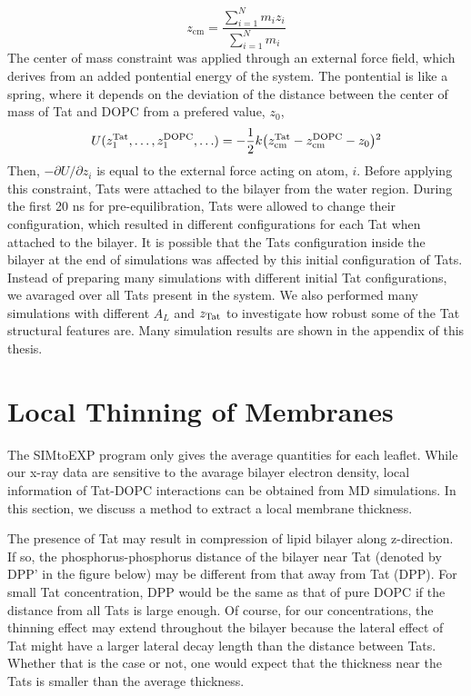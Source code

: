 \documentclass[12pt,letterpaper]{article}
\begin{document}
\begin{equation}
  z_{\mathrm{cm}} = \frac{\sum\limits_{i=1}^N m_iz_i}{\sum\limits_{i=1}^N m_i}
\end{equation}
The center of mass constraint was applied through an external force field,
which derives from an added pontential energy of the system. The pontential 
is like a spring, where it depends on the deviation of the distance 
between the center of mass of Tat and DOPC from a prefered value, $z_0$,
\begin{equation}
  U(z_1^{\mathrm{Tat}},\ldots,z_1^{\mathrm{DOPC}},\ldots) = 
  -\frac{1}{2} k 
  \mathopen{}\left( z_{\mathrm{cm}}^{\mathrm{Tat}} - z_{\mathrm{cm}}^{\mathrm{DOPC}} - z_0 \right)\mathclose{}^2
\end{equation}
Then, $-\partial U/\partial z_i$ is equal to the external force acting 
on atom, $i$. Before applying this constraint, Tats were attached to 
the bilayer from the water region. During the first 20 ns for 
pre-equilibration, Tats were allowed to change their configuration,
which resulted in different configurations for each Tat when attached
to the bilayer. It is possible that the Tats configuration inside the
bilayer at the end of simulations was affected by this initial 
configuration of Tats. Instead of preparing many simulations with
different initial Tat configurations, we avaraged over all Tats
present in the system. We also performed many simulations with
different $A_L$ and $z_{\mathrm{Tat}}$ to investigate how robust some of the 
Tat structural features are. Many simulation results are shown in
the appendix of this thesis. 


\section{Local Thinning of Membranes}
The SIMtoEXP program only gives the average quantities for each leaflet. 
While our x-ray data are sensitive to the avarage bilayer electron density,
local information of Tat-DOPC interactions can be obtained from MD simulations.
In this section, we discuss a method to extract a local membrane thickness.

The presence of Tat may result in compression of lipid bilayer along z-direction. 
If so, the phosphorus-phosphorus distance of the bilayer near Tat (denoted by DPP'
in the figure below) may be different from that away from Tat (DPP).  For 
small Tat concentration, DPP would be the same as that of pure DOPC if the 
distance from all Tats is large enough.  Of course, for our concentrations, 
the thinning effect may extend throughout the bilayer because the lateral
effect of Tat might have a larger lateral decay length than the distance 
between Tats.  Whether that is the case or not, one would expect that the 
thickness near the Tats is smaller than the average thickness.
\end{document}
